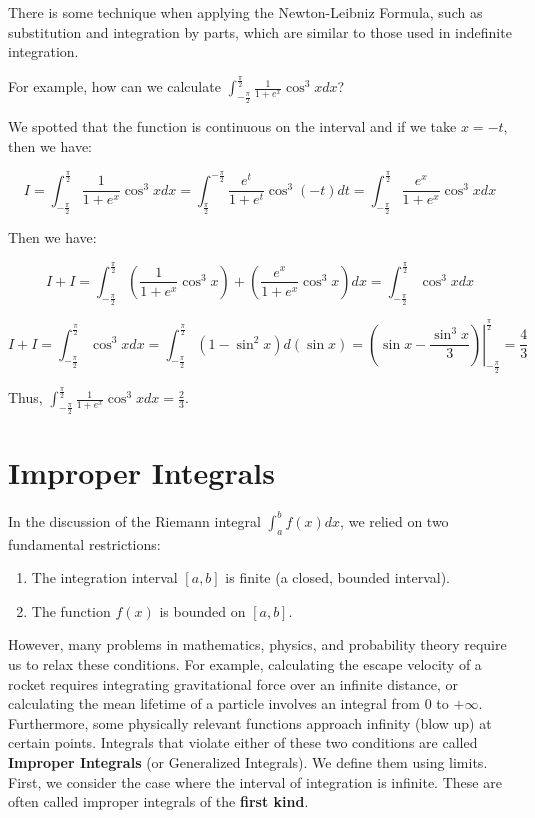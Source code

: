 There is some technique when applying the Newton-Leibniz Formula, such as substitution and integration by parts, which are similar to those used in indefinite integration.

For example, how can we calculate $\int_{-\frac{\pi}{2}}^{\frac{\pi}{2}} \frac{1}{1+e^x} \cos^3 x dx$?

We spotted that the function is continuous on the interval and if we take $x = -t$, then we have:

\[
I = \int_{-\frac{\pi}{2}}^{\frac{\pi}{2}} \frac{1}{1+e^x} \cos^3 x dx = \int_{\frac{\pi}{2}}^{-\frac{\pi}{2}} \frac{e^t}{1+e^t} \cos^3 (-t) dt = \int_{-\frac{\pi}{2}}^{\frac{\pi}{2}} \frac{e^x}{1+e^x} \cos^3 x dx
\]

Then we have:

\[
I + I = \int_{-\frac{\pi}{2}}^{\frac{\pi}{2}} (\frac{1}{1+e^x} \cos^3 x)+(\frac{e^x}{1+e^x} \cos^3 x) dx = \int_{-\frac{\pi}{2}}^{\frac{\pi}{2}} \cos^3 x dx
\]

\[
I + I = \int_{-\frac{\pi}{2}}^{\frac{\pi}{2}} \cos^3 x dx = \int_{-\frac{\pi}{2}}^{\frac{\pi}{2}} (1-\sin^2 x) d(\sin x) = \left. (\sin x - \frac{\sin^3 x}{3}) \right|_{-\frac{\pi}{2}}^{\frac{\pi}{2}} = \frac{4}{3} 
\]

Thus, $\int_{-\frac{\pi}{2}}^{\frac{\pi}{2}} \frac{1}{1+e^x} \cos^3 x dx = \frac{2}{3}$.

\section{Improper Integrals}
In the discussion of the Riemann integral $\int_a^b f(x) dx$, we relied on two fundamental restrictions:

\begin{enumerate}
    \item The integration interval $[a,b]$ is finite (a closed, bounded interval).
    \item The function $f(x)$ is bounded on $[a,b]$.
\end{enumerate}

However, many problems in mathematics, physics, and probability theory require us to relax these conditions. For example, calculating the escape velocity of a rocket requires integrating gravitational force over an infinite distance, or calculating the mean lifetime of a particle involves an integral from $0$ to $+\infty$. Furthermore, some physically relevant functions approach infinity (blow up) at certain points.
Integrals that violate either of these two conditions are called \textbf{Improper Integrals} (or Generalized Integrals). We define them using limits.
First, we consider the case where the interval of integration is infinite. These are often called improper integrals of the \textbf{first kind}.

